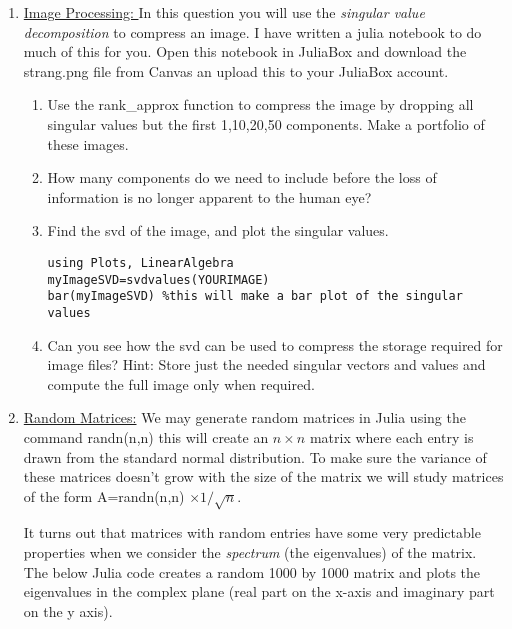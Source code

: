 \documentclass[11pt, a4paper]{article}
\begin{document}
\begin{enumerate}
\item \underline{Image Processing: } 
In this question you will use the \textit{singular value decomposition} to compress an image. I have written a julia notebook to do much of this for you. Open this notebook in JuliaBox and download the strang.png file from Canvas an upload this to your JuliaBox account. 


\begin{enumerate}
\item Use the rank\_approx function to compress the image by dropping all singular values but the first 1,10,20,50 components. Make a portfolio of these images. 
\item How many components do we need to include before the loss of information is no longer apparent to the human eye?
\item Find the svd of the image, and plot the singular values. 
\begin{lstlisting}
using Plots, LinearAlgebra
myImageSVD=svdvalues(YOURIMAGE)
bar(myImageSVD) %this will make a bar plot of the singular values
\end{lstlisting}
\item Can you see how the svd can be used to compress the storage required for image files? Hint: Store just the needed singular vectors and values and compute the full image only when required. 
\end{enumerate}

\item \underline{Random Matrices:} We may generate random matrices in Julia using the command randn(n,n) this will create an $n \times n$ matrix where each entry is drawn from the standard normal distribution. To make sure the variance of these matrices doesn't grow with the size of the matrix we will study matrices of the form A=randn(n,n) $\times 1/\sqrt{n}$. 

It turns out that matrices with random entries have some very predictable properties when we consider the \textit{spectrum} (the eigenvalues) of the matrix. The below Julia code creates a random 1000 by 1000 matrix and plots the eigenvalues in the complex plane (real part on the x-axis and imaginary part on the y axis). 




\end{enumerate}
\end{document}
